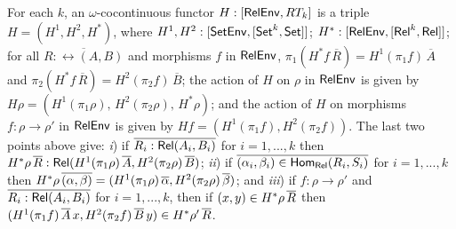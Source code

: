 \documentclass[runningheads]{llncs}
\newcommand{\set}{\mathsf{Set}}
\begin{document}
For each $k$, an $\omega$-cocontinuous functor $H : [\mathsf{RelEnv}, RT_k]$
is a triple $H = (H^1,H^2,H^*)$, where $H^1, H^2 :
[\setenv,[\set^k,\set]]$; $H^* : [\mathsf{RelEnv},[\mathsf{Rel}^k,\mathsf{Rel}]]$; for all
$\overline{R : \rel(A,B)}$ and morphisms $f$ in $\mathsf{RelEnv}$, $\pi_1(H^*f
\,{\overline{R}}) = H^1 (\pi_1 f)\,{\overline{A}}$ and $\pi_2(H^*f
\,{\overline{R}}) = H^2 (\pi_2 f)\,{\overline{B}}$; the action of $H$
on $\rho$ in $\mathsf{RelEnv}$ is given by $H \rho = (H^1 (\pi_1 \rho),\,H^2
(\pi_2 \rho),\,H^*\rho)$; and the action of $H$ on morphisms $f : \rho
\to \rho'$ in $\mathsf{RelEnv}$ is given by $Hf = (H^1 (\pi_1 f),H^2 (\pi_2
f))$.  The last two points above give: {\em i}) if $\overline{R_i :
  \mathsf{Rel}(A_i,B_i)}$ for $i = 1,...,k$ then $H^*\rho\, \overline{R} :
\mathsf{Rel}(H^1(\pi_1 \rho)\, \overline{A}, H^2(\pi_2 \rho)\, \overline{B})$; {\em ii})
if $\overline{(\alpha_i, \beta_i) \in \mathsf{Hom_{Rel}}(R_i,S_i)}$ for $i = 1,...,k$
then $H^*\rho\, \overline{(\alpha, \beta)} = (H^1(\pi_1 \rho)\,\overline{\alpha},
H^2(\pi_2 \rho)\, \overline{\beta})$; and {\em iii}) if $f : \rho \to \rho'$
and $\overline{R_i:\mathsf{Rel}(A_i,B_i)}$ for $i = 1,...,k$, then if $(x, y) \in
H^*\rho\,\overline{R}$ then $(H^1(\pi_1 f)\,{\overline{A}}\,x, H^2(\pi_2
f)\,{\overline{B}}\,y) \in H^*\rho'\,\overline{R}$.
\end{document}
